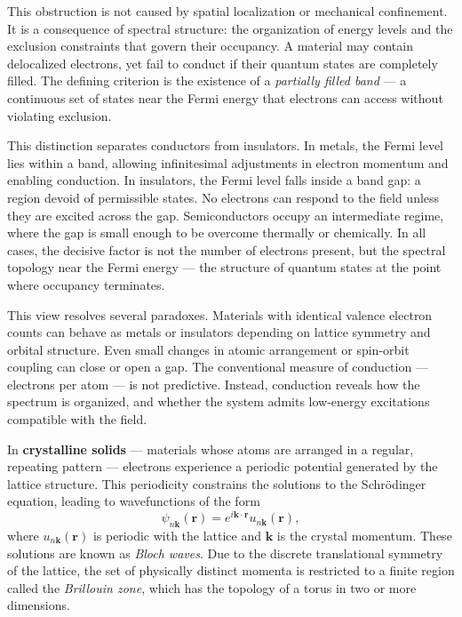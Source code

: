 This obstruction is not caused by spatial localization or mechanical confinement. It is a consequence of spectral structure: the organization of energy levels and the exclusion constraints that govern their occupancy. A material may contain delocalized electrons, yet fail to conduct if their quantum states are completely filled. The defining criterion is the existence of a \emph{partially filled band} — a continuous set of states near the Fermi energy that electrons can access without violating exclusion.

This distinction separates conductors from insulators. In metals, the Fermi level lies within a band, allowing infinitesimal adjustments in electron momentum and enabling conduction. In insulators, the Fermi level falls inside a band gap: a region devoid of permissible states. No electrons can respond to the field unless they are excited across the gap. Semiconductors occupy an intermediate regime, where the gap is small enough to be overcome thermally or chemically. In all cases, the decisive factor is not the number of electrons present, but the spectral topology near the Fermi energy — the structure of quantum states at the point where occupancy terminates.

This view resolves several paradoxes. Materials with identical valence electron counts can behave as metals or insulators depending on lattice symmetry and orbital structure. Even small changes in atomic arrangement or spin-orbit coupling can close or open a gap. The conventional measure of conduction — electrons per atom — is not predictive. Instead, conduction reveals how the spectrum is organized, and whether the system admits low-energy excitations compatible with the field.

In \textbf{crystalline solids} — materials whose atoms are arranged in a regular, repeating pattern — electrons experience a periodic potential generated by the lattice structure. This periodicity constrains the solutions to the Schrödinger equation, leading to wavefunctions of the form
\[
\psi_{n\mathbf{k}}(\mathbf{r}) = e^{i\mathbf{k} \cdot \mathbf{r}} u_{n\mathbf{k}}(\mathbf{r}),
\]
where \( u_{n\mathbf{k}}(\mathbf{r}) \) is periodic with the lattice and \( \mathbf{k} \) is the crystal momentum. These solutions are known as \emph{Bloch waves}. Due to the discrete translational symmetry of the lattice, the set of physically distinct momenta is restricted to a finite region called the \emph{Brillouin zone}, which has the topology of a torus in two or more dimensions.

